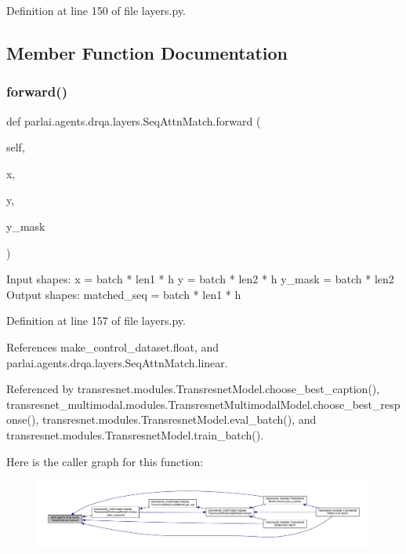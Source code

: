 Definition at line 150 of file layers.\+py.



\subsection{Member Function Documentation}
\mbox{\label{classparlai_1_1agents_1_1drqa_1_1layers_1_1SeqAttnMatch_ade14c6394d52f566a64da6573e8c913b}} 
\subsubsection{\texorpdfstring{forward()}{forward()}}
{\footnotesize\ttfamily def parlai.\+agents.\+drqa.\+layers.\+Seq\+Attn\+Match.\+forward (\begin{DoxyParamCaption}\item[{}]{self,  }\item[{}]{x,  }\item[{}]{y,  }\item[{}]{y\+\_\+mask }\end{DoxyParamCaption})}

\begin{DoxyVerb}Input shapes:
    x = batch * len1 * h
    y = batch * len2 * h
    y_mask = batch * len2
Output shapes:
    matched_seq = batch * len1 * h
\end{DoxyVerb}
 

Definition at line 157 of file layers.\+py.



References make\+\_\+control\+\_\+dataset.\+float, and parlai.\+agents.\+drqa.\+layers.\+Seq\+Attn\+Match.\+linear.



Referenced by transresnet.\+modules.\+Transresnet\+Model.\+choose\+\_\+best\+\_\+caption(), transresnet\+\_\+multimodal.\+modules.\+Transresnet\+Multimodal\+Model.\+choose\+\_\+best\+\_\+response(), transresnet.\+modules.\+Transresnet\+Model.\+eval\+\_\+batch(), and transresnet.\+modules.\+Transresnet\+Model.\+train\+\_\+batch().

Here is the caller graph for this function\+:
\nopagebreak
\begin{figure}[H]
\begin{center}
\leavevmode
\includegraphics[width=350pt]{classparlai_1_1agents_1_1drqa_1_1layers_1_1SeqAttnMatch_ade14c6394d52f566a64da6573e8c913b_icgraph}
\end{center}
\end{figure}


